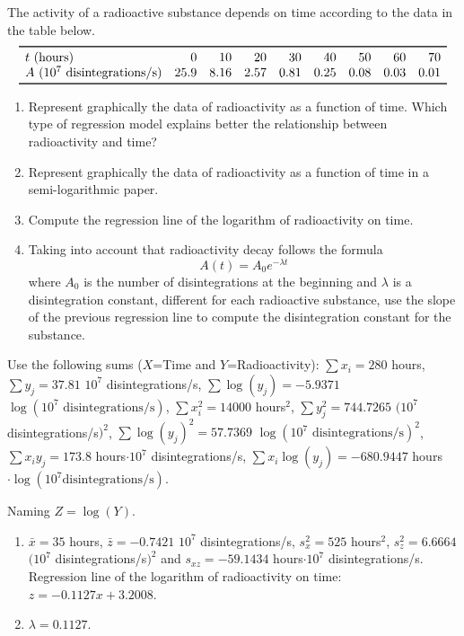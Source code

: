 {The activity of a radioactive substance depends on time according to the data in the table below.
\[
\begin{array}{lrrrrrrrr}
\toprule
t\mbox{ (hours)} & 0 & 10 & 20 & 30 & 40 & 50 & 60 & 70 \\
A\mbox{ ($10^7$ disintegrations/s)} & 25.9 & 8.16 & 2.57 & 0.81 & 0.25 & 0.08 & 0.03 & 0.01\\
\bottomrule
\end{array}
\]

\begin{enumerate}
\item Represent graphically the data of radioactivity as a function of time.
Which type of regression model explains better the relationship between radioactivity and time?
\item Represent graphically the data of radioactivity as a function of time in a semi-logarithmic paper.
\item Compute the regression line of the logarithm of radioactivity on time.
\item Taking into account that radioactivity decay follows the formula
\[
A(t) = A_0 e^{-\lambda t}
\]
where $A_0$ is the number of disintegrations at the beginning and $\lambda$ is a disintegration constant, different for each radioactive substance, use the slope of the previous regression line to compute the disintegration constant for the substance.
\end{enumerate}
Use the following sums ($X$=Time and $Y$=Radioactivity): $\sum x_i=280$ hours, $\sum y_j=37.81$ $10^7$ disintegrations/s, $\sum \log(y_j)=-5.9371$  $\log(10^7 \mbox{ disintegrations/s})$, $\sum x_i^2=14000$ hours$^2$, $\sum y_j^2=744.7265$ $(10^7$ disintegrations/s$)^2$, $\sum \log(y_j)^2=57.7369$  $\log(10^7 \mbox{ disintegrations/s})^2$, $\sum x_iy_j=173.8$ hours$\cdot 10^7$ disintegrations/s, $\sum x_i\log(y_j)=-680.9447$ hours$\cdot \log(10^7 \mbox{disintegrations/s})$.
}
{Naming $Z=\log(Y)$.
\begin{enumerate}[start=3]
\item $\bar x=35$ hours, $\bar z=-0.7421$ $10^7$ disintegrations/s, $s_x^2=525$ hours$^2$, $s_z^2=6.6664$ $(10^7$ disintegrations/s$)^2$ and $s_{xz}=-59.1434$ hours$\cdot 10^7$ disintegrations/s.\\
Regression line of the logarithm of radioactivity on time: $z=-0.1127x+3.2008$.
\item $\lambda=0.1127$.
\end{enumerate}
}
{}


